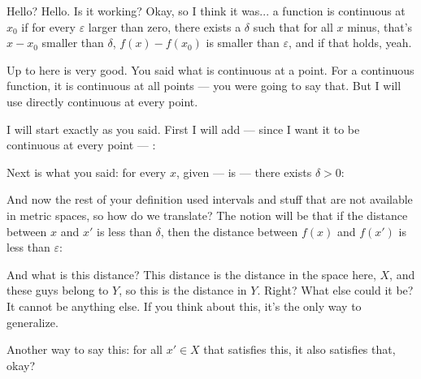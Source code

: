\begin{student}
Hello? Hello. Is it working? Okay, so I think it was... a function is continuous at $x_0$ if for every $\varepsilon$ larger than zero, there exists a $\delta$ such that for all $x$ minus, that's $x - x_0$ smaller than $\delta$, $f(x) - f(x_0)$ is smaller than $\varepsilon$, and if that holds, yeah.
\end{student}

\begin{speech}[01:00:52 - 01:02:43]
Up to here is very good. You said what is continuous at a point. For a continuous function, it is continuous at all points --- you were going to say that. But I will use directly continuous at every point.

I will start exactly as you said. First I will add --- since I want it to be continuous at every point --- : 

Next is what you said: for every $x$, given ---  is  --- there exists $\delta > 0$: 

And now the rest of your definition used intervals and stuff that are not available in metric spaces, so how do we translate? The notion will be that if the distance between $x$ and $x'$ is less than $\delta$, then the distance between $f(x)$ and $f(x')$ is less than $\varepsilon$: 

And what is this distance? This distance is the distance in the space here, $X$, and these guys belong to $Y$, so this is the distance in $Y$.  Right? What else could it be? It cannot be anything else. If you think about this, it's the only way to generalize.

Another way to say this: for all $x' \in X$ that satisfies this, it also satisfies that, okay? 
\end{speech}

